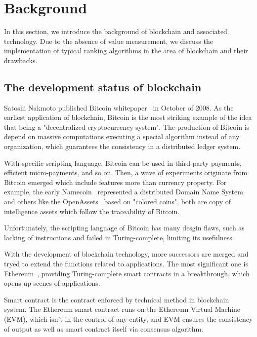 
\section{Background}
In this section, we introduce the background of blockchain and associated technology. Due to the absence of value measurement, we discuss the implementation of typical ranking algorithms in the area of blockchain and their drawbacks.

\subsection{The development status of blockchain}

Satoshi Nakmoto published Bitcoin whitepaper~\cite{Nakamoto2008} in October of 2008. As the earliest application of blockchain, Bitcoin is the most striking example of the idea that being a "decentralized cryptocurrency system". The production of Bitcoin is depend on massive computations executing a special algorithm instead of any organization, which guarantees the consistency in a distributed ledger system.

With specific scripting language, Bitcoin can be used in third-party payments, efficient micro-payments, and so on. Then, a wave of experiments originate from Bitcoin emerged which include features more than currency property. For example, the early Namecoin~\cite{Namecoin} represented a distributed Domain Name System and others like the OpenAssets~\cite{OpenAssets} based on "colored coins", both are copy of intelligence assets which follow the traceability of Bitcoin.

Unfortunately, the scripting language of Bitcoin has many desgin flaws, such as lacking of instructions and failed in Turing-complete, limiting its usefulness.

With the development of blockchain technology, more successors are merged and tryed to extend the functions related to applications. The most significant one is Ethereum~\cite{buterin2013ethereum}, providing Turing-complete smart contracts in a breakthrough, which opens up scenes of applications.

Smart contract is the contract enforced by technical method in blockchain system. The Ethereum smart contract runs on the Ethereum Virtual Machine (EVM), which isn't in the control of any entity, and EVM ensures the consistency of output as well as smart contract itself via consensus algorithm.

